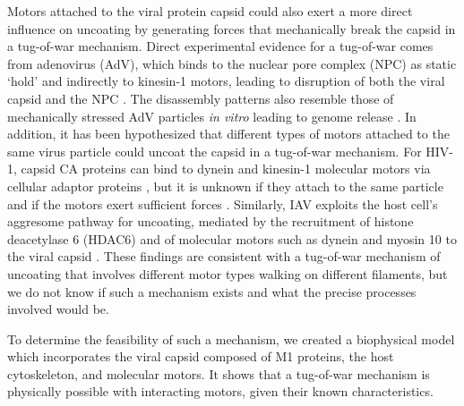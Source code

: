 Motors attached to the viral protein capsid could also exert a more direct influence on uncoating by generating forces that mechanically break the capsid in a tug-of-war mechanism. Direct experimental evidence for a tug-of-war comes from adenovirus (AdV), which binds to the nuclear pore complex (NPC) as static ‘hold’ and indirectly to kinesin-1 motors, leading to disruption of both the viral capsid and the NPC \cite{greber2019adenovirus, strunze2011kinesin}. The disassembly patterns also resemble those of mechanically stressed AdV particles \textit{in vitro} leading to genome release \cite{ortega2015fluorescence, ortega2013monitoring}. In addition, it has been hypothesized that different types of motors attached to the same virus particle could uncoat the capsid in a tug-of-war mechanism. For HIV-1, capsid CA proteins can bind to dynein and kinesin-1 molecular motors via cellular adaptor proteins \cite{carnes2018hiv, lukic2014hiv, malikov2017localized}, but it is unknown if they attach to the same particle and if the motors exert sufficient forces \cite{malikov2017localized}. Similarly, IAV exploits the host cell’s aggresome pathway for uncoating, mediated by the recruitment of histone deacetylase 6 (HDAC6) and of molecular motors such as dynein and myosin 10 to the viral capsid \cite{banerjee2014influenza}. These findings are consistent with a tug-of-war mechanism of uncoating that involves different motor types walking on different filaments, but we do not know if such a mechanism exists and what the precise processes involved would be.

To determine the feasibility of such a mechanism, we created a biophysical model which incorporates the viral capsid composed of M1 proteins, the host cytoskeleton, and molecular motors. It shows that a tug-of-war mechanism is physically possible with interacting motors, given their known characteristics.
